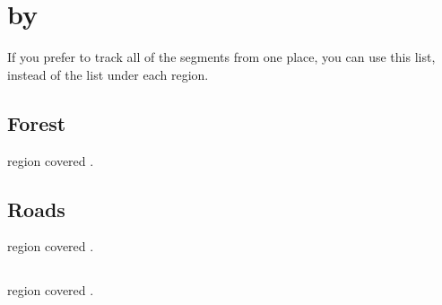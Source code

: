 
\printindex[history]

\label{talismanIndex}
\printindex[talismans]

\printindex[spells]

\printindex

\section{ by }

If you prefer to track all of the \glspl{segment} from one place, you can use this list, instead of the list under each \gls{region}.

\bigLine

\begin{multicols*}{2}

\raggedbottom

\subsection{Forest }

\Gls{region} covered .


\bigLine

\subsection{Roads }

\Gls{region} covered .


\bigLine

\subsection{ }

\Gls{region} covered .


\end{multicols*}
